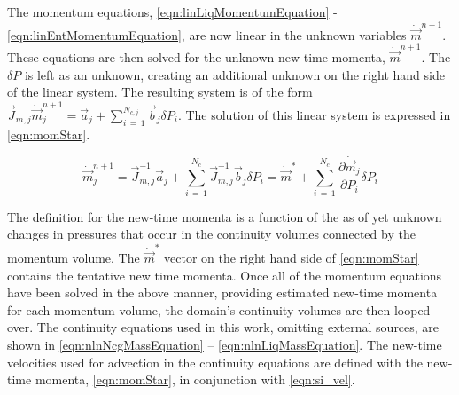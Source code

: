 The momentum equations, \eqref{eqn:linLiqMomentumEquation} - \eqref{eqn:linEntMomentumEquation}, are now linear in the unknown variables $\dot{\vec{m}}^{n+1}$.
These equations are then solved for the unknown new time momenta, $\dot{\vec{m}}^{n+1}$.
The $\delta P$ is left as an unknown, creating an additional unknown on the right hand side of the linear system.
The resulting system is of the form $\displaystyle \vec{J}_{m, j} \dot{\vec{m}}_{j}^{n+1} = \vec{a}_{j} + \sum^{N_{c,j}}_{i\,=\,1} \vec{b}_{j} \delta P_{i}$.
The solution of this linear system is expressed in \eqref{eqn:momStar}.

\begin{equation}
\label{eqn:momStar}
\dot{\vec{m}}_{j}^{n+1} = \vec{J}_{m,j}^{-1} \vec{a}_{j} + \sum^{N_{c}}_{i\,=\,1} \vec{J}_{m,j}^{-1} \vec{b}_{j} \delta P_{i} = \dot{\vec{m}}^{*} + \sum^{N_{c}}_{i\,=\,1} \frac{\partial \dot{\vec{m}}_{j}}{\partial P_{i}} \delta P_{i}
\end{equation}

The definition for the new-time momenta is a function of the as of yet unknown changes in pressures that occur in the continuity volumes connected by the momentum volume.
The $\dot{\vec{m}}^{*}$ vector on the right hand side of \eqref{eqn:momStar} contains the tentative new time momenta.
Once all of the momentum equations have been solved in the above manner, providing estimated new-time momenta for each momentum volume, the domain's continuity volumes are then looped over.
The continuity equations used in this work, omitting external sources, are shown in \eqref{eqn:nlnNcgMassEquation} -- \eqref{eqn:nlnLiqMassEquation}. 
The new-time velocities used for advection in the continuity equations are defined with the new-time momenta, \eqref{eqn:momStar}, in conjunction with \eqref{eqn:si_vel}.


